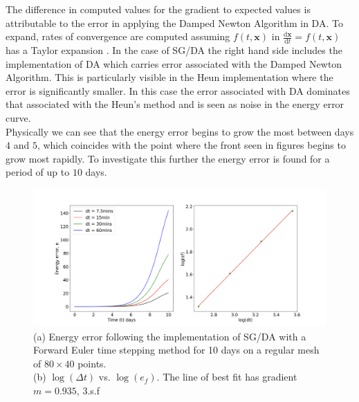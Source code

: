 The difference in computed values for the gradient to expected values is attributable to the error in applying the Damped Newton Algorithm in DA. To expand, rates of convergence are computed assuming $f(t,\bm{x})$ in $\frac{\textrm{d}\bm{x}}{\textrm{d}t} = f(t,\bm{x})$ has a Taylor expansion \cite{Griffiths2010}. In the case of SG/DA the right hand side includes the implementation of DA which carries error associated with the Damped Newton Algorithm. This is particularly visible in the Heun implementation where the error is significantly smaller. In this case the error associated with DA dominates that associated with the Heun's method and is seen as noise in the energy error curve.\\
\linebreak
Physically we can see that the energy error begins to grow the most between days $4$ and $5$, which coincides with the point where the front seen in figures  begins to grow most rapidly. To investigate this further the energy error is found for a period of up to $10$ days.
\begin{figure}[ht]
	\centering
	\includegraphics[width=1.1\linewidth]{evaluation/energy_10D_euler}
	\caption[Energy Error from implementation of SG/DA via Forward Euler timestepping method for 10 days]{(a) Energy error following the implementation of SG/DA with a Forward Euler time stepping method for 10 days on a regular mesh of $80 \times 40$ points.\\ (b) $\log(\Delta t)$ vs. $\log(e_f)$. The line of best fit has gradient $m = 0.935$, 3.s.f}
	\label{fig:energy10deuler}
\end{figure}
